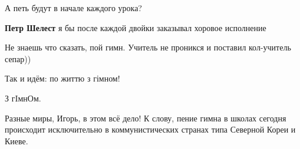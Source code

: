 \begin{itemize}
\begin{itemize}
\end{itemize} %

А петь будут в начале каждого урока?

\begin{itemize} %
\textbf{Петр Шелест} я бы после каждой двойки заказывал хоровое исполнение

Не знаешь что сказать, пой гимн. Учитель не проникся и поставил кол-учитель сепар))
\end{itemize} %

Так и идём: по життю з гімном!

\begin{itemize} %
З гIмнОм.
\end{itemize} %


Разные миры, Игорь, в этом всё дело! К слову, пение гимна в школах сегодня
происходит исключительно в коммунистических странах типа Северной Кореи и
Киеве.



\end{itemize} %
